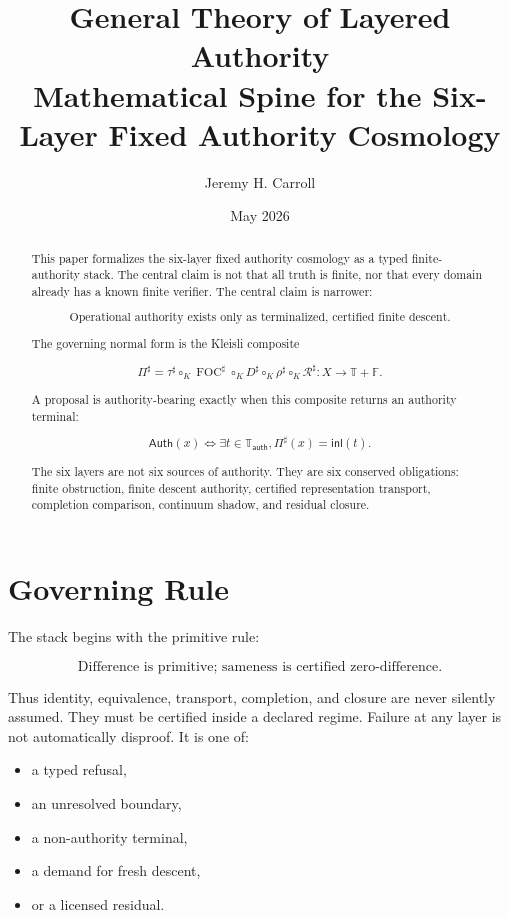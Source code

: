 \documentclass[11pt]{article}
\title{General Theory of Layered Authority \\ \large Mathematical Spine for the Six-Layer Fixed Authority Cosmology}
\author{Jeremy H. Carroll}
\date{May 2026}
\begin{document}
\maketitle

\begin{abstract}
This paper formalizes the six-layer fixed authority cosmology as a typed finite-authority stack. The central claim is not that all truth is finite, nor that every domain already has a known finite verifier. The central claim is narrower:

\[
\boxed{
\text{Operational authority exists only as terminalized, certified finite descent.}
}
\]

The governing normal form is the Kleisli composite

\[
\boxed{
\Pi^\sharp
=
\tau^\sharp
\circ_K
\operatorname{FOC}^\sharp
\circ_K
D^\sharp
\circ_K
\rho^\sharp
\circ_K
\mathcal R^\sharp
:
X\to \mathbb T+\mathbb F.
}
\]

A proposal is authority-bearing exactly when this composite returns an authority terminal:

\[
\boxed{
\mathsf{Auth}(x)
\iff
\exists t\in \mathbb T_{\mathsf{auth}},
\Pi^\sharp(x)=\mathsf{inl}(t).
}
\]

The six layers are not six sources of authority. They are six conserved obligations: finite obstruction, finite descent authority, certified representation transport, completion comparison, continuum shadow, and residual closure.
\end{abstract}

\section{Governing Rule}

The stack begins with the primitive rule:

\[
\boxed{
\text{Difference is primitive; sameness is certified zero-difference.}
}
\]

Thus identity, equivalence, transport, completion, and closure are never silently assumed. They must be certified inside a declared regime. Failure at any layer is not automatically disproof. It is one of:

\begin{itemize}
    \item a typed refusal,
    \item an unresolved boundary,
    \item a non-authority terminal,
    \item a demand for fresh descent,
    \item or a licensed residual.
\end{itemize}
\end{document}
